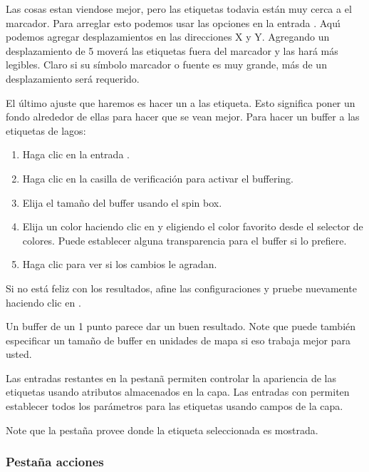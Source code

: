 Las cosas estan viendose mejor, pero las etiquetas todavia est\'an muy cerca a el marcador. Para
arreglar esto podemos usar las opciones en la entrada . Aqu\'{\i} podemos agregar 
desplazamientos en las direcciones X y Y. Agregando un desplazamiento de 5 mover\'a las etiquetas
fuera del marcador y las har\'a más legibles. Claro si su s\'{i}mbolo marcador
o fuente es muy grande, más de un desplazamiento ser\'a requerido.

El \'ultimo ajuste que haremos es hacer un  a las etiqueta. Esto significa
poner un fondo alrededor de ellas para hacer que se vean mejor. Para hacer un buffer a las
etiquetas de lagos:

\begin{enumerate}
\item Haga clic en la entrada .
\item Haga clic en la casilla de verificaci\'on   para activar el buffering.
\item Elija el tama\~no del buffer usando el spin box.
\item Elija un color haciendo clic en  y eligiendo el color favorito
  desde el selector de colores. Puede establecer alguna transparencia para el buffer
  si lo prefiere.
\item Haga clic  para ver si los cambios le agradan.
\end{enumerate} 

Si no est\'a feliz con los resultados, afine las configuraciones y pruebe nuevamente
haciendo clic en .

Un buffer de un 1 punto parece dar un buen resultado.
Note que puede también especificar un tama\~no de buffer en unidades de mapa si eso trabaja mejor
para usted.

Las entradas restantes en la pestan\~a  permiten controlar la apariencia de las
etiquetas usando atributos almacenados en la capa. Las entradas con  permiten establecer
todos los par\'ametros para las etiquetas usando campos de la capa.

Note que la pesta\~na  provee  donde 
la etiqueta seleccionada es mostrada.

\subsubsection{Pesta\~na acciones}\label{label_actions}

